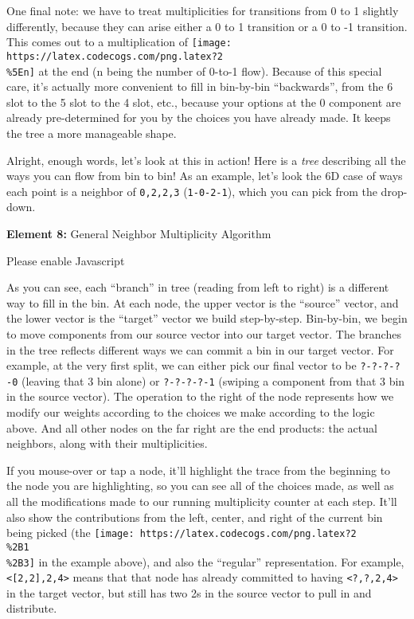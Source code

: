 \documentclass[]{article}
\begin{document}
One final note: we have to treat multiplicities for transitions from 0 to 1
slightly differently, because they can arise either a 0 to 1 transition or a 0
to -1 transition. This comes out to a multiplication of
\texttt{[image: https://latex.codecogs.com/png.latex?2\\\%5En]} at the end (n
being the number of 0-to-1 flow). Because of this special care, it's actually
more convenient to fill in bin-by-bin ``backwards'', from the 6 slot to the 5
slot to the 4 slot, etc., because your options at the 0 component are already
pre-determined for you by the choices you have already made. It keeps the tree a
more manageable shape.

Alright, enough words, let's look at this in action! Here is a \emph{tree}
describing all the ways you can flow from bin to bin! As an example, let's look
the 6D case of ways each point is a neighbor of \texttt{0,2,2,3}
(\texttt{1-0-2-1}), which you can pick from the drop-down.

\leavevmode\hypertarget{golTree}{}%
\textbf{Element 8:} General Neighbor Multiplicity Algorithm

\leavevmode\hypertarget{golTreeCont}{}%
Please enable Javascript

As you can see, each ``branch'' in tree (reading from left to right) is a
different way to fill in the bin. At each node, the upper vector is the
``source'' vector, and the lower vector is the ``target'' vector we build
step-by-step. Bin-by-bin, we begin to move components from our source vector
into our target vector. The branches in the tree reflects different ways we can
commit a bin in our target vector. For example, at the very first split, we can
either pick our final vector to be \texttt{?-?-?-?-0} (leaving that 3 bin alone)
or \texttt{?-?-?-?-1} (swiping a component from that 3 bin in the source
vector). The operation to the right of the node represents how we modify our
weights according to the choices we make according to the logic above. And all
other nodes on the far right are the end products: the actual neighbors, along
with their multiplicities.

If you mouse-over or tap a node, it'll highlight the trace from the beginning to
the node you are highlighting, so you can see all of the choices made, as well
as all the modifications made to our running multiplicity counter at each step.
It'll also show the contributions from the left, center, and right of the
current bin being picked (the
\texttt{[image: https://latex.codecogs.com/png.latex?2\\\%2B1\\\%2B3]} in the
example above), and also the ``regular'' representation. For example,
\texttt{\textless{}{[}2,2{]},2,4\textgreater{}} means that that node has already
committed to having \texttt{\textless{}?,?,2,4\textgreater{}} in the target
vector, but still has two 2s in the source vector to pull in and distribute.
\end{document}
